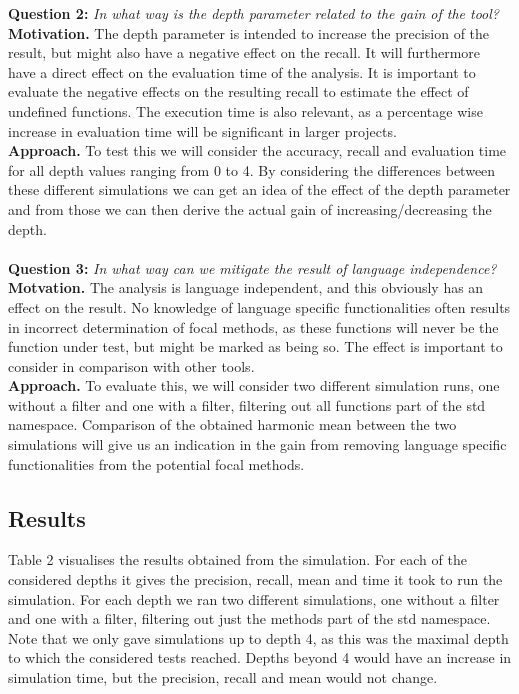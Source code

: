 \documentclass[11pt]{article}
\begin{document}
\begin{multicols}{2}
\noindent
\textbf{Question 2:} \textit{In what way is the depth parameter related to the gain of the tool?}\\
\textbf{Motivation.} The depth parameter is intended to increase the precision of the result, but might also have a negative effect on the recall. It will furthermore have a direct effect on the evaluation time of the analysis. It is important to evaluate the negative effects on the resulting recall to estimate the effect of undefined functions. The execution time is also relevant, as a percentage wise increase in evaluation time will be significant in larger projects.\\
\textbf{Approach.} To test this we will consider the accuracy, recall and evaluation time for all depth values ranging from 0 to 4. By considering the differences between these different simulations we can get an idea of the effect of the depth parameter and from those we can then derive the actual gain of increasing/decreasing the depth. \\
\\
\noindent
\textbf{Question 3:} \textit{In what way can we mitigate the result of language independence?}\\
\textbf{Motvation.} The analysis is language independent, and this obviously has an effect on the result. No knowledge of language specific functionalities often results in incorrect determination of focal methods, as these functions will never be the function under test, but might be marked as being so. The effect is important to consider in comparison with other tools. \\
\textbf{Approach.} To evaluate this, we will consider two different simulation runs, one without a filter and one with a filter, filtering out all functions part of the std namespace. Comparison of the obtained harmonic mean between the two simulations will give us an indication in the gain from removing language specific functionalities from the potential focal methods.

\subsection{Results}
Table 2 visualises the results obtained from the simulation. For each of the considered depths it gives the precision, recall, mean and time it took to run the simulation. For each depth we ran two different simulations, one without a filter and one with a filter, filtering out just the methods part of the std namespace. Note that we only gave simulations up to depth 4, as this was the maximal depth to which the considered tests reached. Depths beyond 4 would have an increase in simulation time, but the precision, recall and mean would not change.


\end{multicols}
\end{document}
